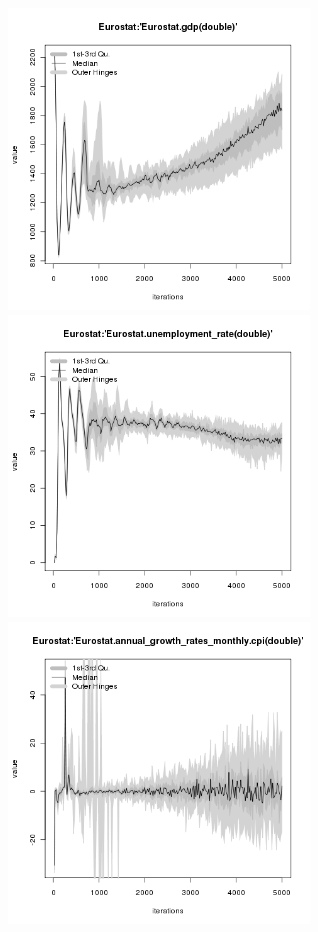 
\begin{figure}[ht!]
\centering\leavevmode
\begin{minipage}{17cm}
\centering\leavevmode
\includegraphics[width=8cm]{./transient/tax_0.10/Eurostat-gdp-timebatch.png}
\includegraphics[width=8cm]{./transient/tax_0.10/Eurostat-unemployment_rate-timebatch.png}\\
\includegraphics[width=8cm]{./transient/tax_0.10/Eurostat-cpi-timebatch.png}

\end{minipage}
\end{figure}
